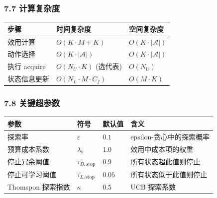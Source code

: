 \documentclass[
  12pt,
]{ctexart}
\begin{document}
\subsubsection{7.7 计算复杂度}\label{ux8ba1ux7b97ux590dux6742ux5ea6-6}

\begin{longtable}[]{@{}lll@{}}
\toprule\noalign{}
步骤 & 时间复杂度 & 空间复杂度 \\
\midrule\noalign{}
\endhead
\bottomrule\noalign{}
\endlastfoot
效用计算 & \(O(K \cdot M + K)\) & \(O(K \cdot |\mathcal{A}|)\) \\
动作选择 & \(O(K \cdot |\mathcal{A}|)\) &
\(O(K \cdot |\mathcal{A}|)\) \\
执行 acquire & \(O(N_U \cdot K)\) (选代表) & \(O(N_U)\) \\
状态信息更新 & \(O(N_L \cdot M \cdot C_f)\) & \(O(M \cdot K)\) \\
\end{longtable}

\subsubsection{7.8 关键超参数}\label{ux5173ux952eux8d85ux53c2ux6570-6}

\begin{longtable}[]{@{}
  >{\raggedright\arraybackslash}p{}
  >{\raggedright\arraybackslash}p{}
  >{\raggedright\arraybackslash}p{}
  >{\raggedright\arraybackslash}p{}@{}}
\toprule\noalign{}
\begin{minipage}[b]{\linewidth}\raggedright
参数
\end{minipage} & \begin{minipage}[b]{\linewidth}\raggedright
符号
\end{minipage} & \begin{minipage}[b]{\linewidth}\raggedright
默认值
\end{minipage} & \begin{minipage}[b]{\linewidth}\raggedright
含义
\end{minipage} \\
\midrule\noalign{}
\endhead
\bottomrule\noalign{}
\endlastfoot
探索率 & \(\varepsilon\) & \(0.1\) & epsilon-贪心中的探索概率 \\
预算成本系数 & \(\lambda_b\) & \(1.0\) & 效用中成本项的权重 \\
停止冗余阈值 & \(\tau_{D,\text{stop}}\) & \(0.9\) &
所有状态超此值则停止 \\
停止可学习阈值 & \(\tau_{L,\text{stop}}\) & \(0.05\) &
所有状态低于此值则停止 \\
Thomspon 探索指数 & \(\kappa\) & \(0.5\) & UCB 探索系数 \\
\end{longtable}
\end{document}
